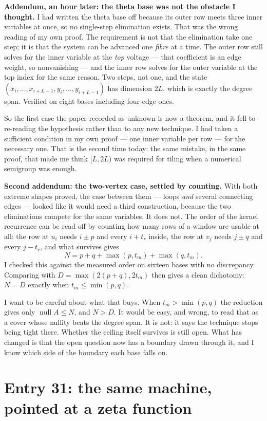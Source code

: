 \documentclass[12pt]{article}
\begin{document}
\textbf{Addendum, an hour later: the theta base was not the obstacle I thought.}
I had written the theta base off because its outer row meets three inner
variables at once, so no single-step elimination exists. That was the wrong
reading of my own proof. The requirement is not that the elimination take one
step; it is that the system can be advanced one \emph{fibre} at a time. The
outer row still solves for the inner variable at the \emph{top} voltage --- that
coefficient is an edge weight, so nonvanishing --- and the inner row solves for
the outer variable at the top index for the same reason. Two steps, not one, and
the state $(x_i,\dots,x_{i+L-1},y_i,\dots,y_{i+L-1})$ has dimension $2L$, which
is exactly the degree span. Verified on eight bases including four-edge ones.

So the first case the paper recorded as unknown is now a theorem, and it fell to
re-reading the hypothesis rather than to any new technique. I had taken a
sufficient condition in my own proof --- one inner variable per row --- for the
necessary one. That is the second time today: the same mistake, in the same
proof, that made me think $[L,2L)$ was required for tiling when a numerical
semigroup was enough.

\textbf{Second addendum: the two-vertex case, settled by counting.} With both
extreme shapes proved, the case between them --- loops \emph{and} several
connecting edges --- looked like it would need a third construction, because the
two eliminations compete for the same variables. It does not. The order of the
kernel recurrence can be read off by counting how many rows of a window are
usable at all: the row at $u_i$ needs $i\pm p$ and every $i+t_r$ inside, the row
at $v_j$ needs $j\pm q$ and every $j-t_r$, and what survives gives
\[
  N=p+q+\max(p,t_m)+\max(q,t_m).
\]
I checked this against the measured order on sixteen bases with no discrepancy.
Comparing with $D=\max(2(p+q),2t_m)$ then gives a clean dichotomy: $N=D$ exactly
when $t_m\le\min(p,q)$.

I want to be careful about what that buys. When $t_m>\min(p,q)$ the reduction
gives only $\operatorname{null}A\le N$, and $N>D$. It would be easy, and wrong,
to read that as a cover whose nullity beats the degree span. It is not: it says
the technique stops being tight there. Whether the ceiling itself survives is
still open. What has changed is that the open question now has a boundary drawn
through it, and I know which side of the boundary each base falls on.

\section*{Entry 31: the same machine, pointed at a zeta function}
\end{document}
